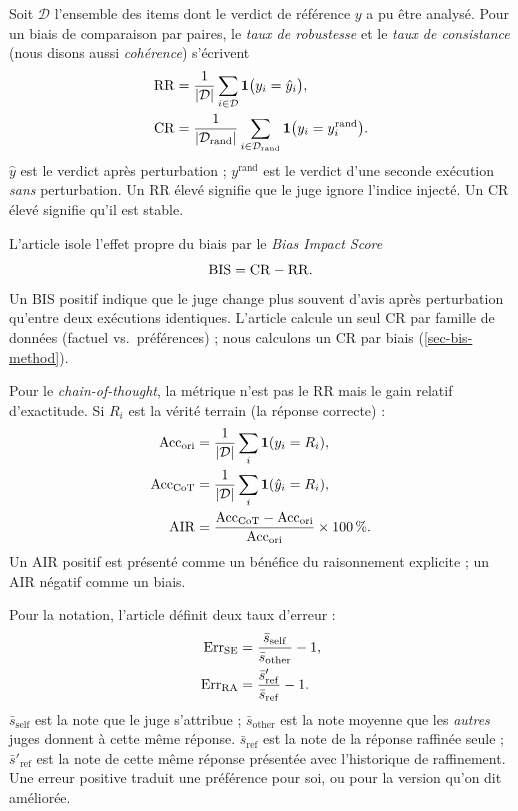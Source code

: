 Soit $\mathcal{D}$ l'ensemble des items dont le verdict de référence $y$ a pu être analysé. Pour un biais de comparaison par paires, le \emph{taux de robustesse} et le \emph{taux de consistance} (nous disons aussi \emph{cohérence}) s'écrivent
\begin{align}
  \mathrm{RR} &= \frac{1}{|\mathcal{D}|} \sum_{i \in \mathcal{D}} \mathbf{1}\bigl(y_i = \hat{y}_i\bigr),
  \label{eq-rr} \\
  \mathrm{CR} &= \frac{1}{|\mathcal{D}_{\mathrm{rand}}|} \sum_{i \in \mathcal{D}_{\mathrm{rand}}} \mathbf{1}\bigl(y_i = y_i^{\mathrm{rand}}\bigr).
  \label{eq-cr}
\end{align}
$\hat{y}$ est le verdict après perturbation ; $y^{\mathrm{rand}}$ est le verdict d'une seconde exécution \emph{sans} perturbation. Un RR élevé signifie que le juge ignore l'indice injecté. Un CR élevé signifie qu'il est stable.

L'article isole l'effet propre du biais par le \emph{Bias Impact Score}
\begin{equation}
  \mathrm{BIS} = \mathrm{CR} - \mathrm{RR}.
  \label{eq-bis}
\end{equation}
Un BIS positif indique que le juge change plus souvent d'avis après perturbation qu'entre deux exécutions identiques. L'article calcule un seul CR par famille de données (factuel vs.\ préférences) ; nous calculons un CR par biais (\cref{sec-bis-method}).

Pour le \emph{chain-of-thought}, la métrique n'est pas le RR mais le gain relatif d'exactitude. Si $R_i$ est la vérité terrain (la réponse correcte) :
\begin{align}
  \mathrm{Acc}_{\mathrm{ori}} &= \frac{1}{|\mathcal{D}|} \sum_i \mathbf{1}(y_i = R_i),
  \label{eq-accori} \\
  \mathrm{Acc}_{\mathrm{CoT}} &= \frac{1}{|\mathcal{D}|} \sum_i \mathbf{1}(\hat{y}_i = R_i),
  \label{eq-acccot} \\
  \mathrm{AIR} &= \frac{\mathrm{Acc}_{\mathrm{CoT}} - \mathrm{Acc}_{\mathrm{ori}}}{\mathrm{Acc}_{\mathrm{ori}}} \times 100\,\%.
  \label{eq-air}
\end{align}
Un AIR positif est présenté comme un bénéfice du raisonnement explicite ; un AIR négatif comme un biais.

Pour la notation, l'article définit deux taux d'erreur :
\begin{align}
  \mathrm{Err}_{\mathrm{SE}} &= \frac{\bar{s}_{\mathrm{self}}}{\bar{s}_{\mathrm{other}}} - 1,
  \label{eq-errse} \\
  \mathrm{Err}_{\mathrm{RA}} &= \frac{\bar{s}'_{\mathrm{ref}}}{\bar{s}_{\mathrm{ref}}} - 1.
  \label{eq-errra}
\end{align}
$\bar{s}_{\mathrm{self}}$ est la note que le juge s'attribue ; $\bar{s}_{\mathrm{other}}$ est la note moyenne que les \emph{autres} juges donnent à cette même réponse. $\bar{s}_{\mathrm{ref}}$ est la note de la réponse raffinée seule ; $\bar{s}'_{\mathrm{ref}}$ est la note de cette même réponse présentée avec l'historique de raffinement. Une erreur positive traduit une préférence pour soi, ou pour la version qu'on dit améliorée.

